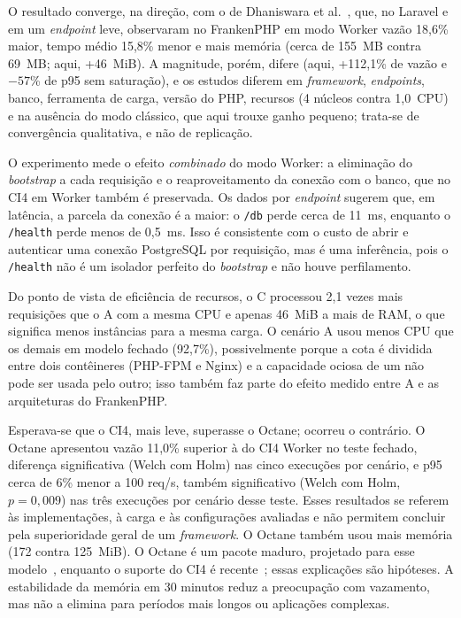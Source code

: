 O resultado converge, na direção, com o de Dhaniswara et al.~\cite{dhaniswara2025}, que, no Laravel e em um \textit{endpoint} leve, observaram no FrankenPHP em modo Worker vazão 18,6\% maior, tempo médio 15,8\% menor e mais memória (cerca de 155~MB contra 69~MB; aqui, +46~MiB). A magnitude, porém, difere (aqui, +112,1\% de vazão e $-57$\% de p95 sem saturação), e os estudos diferem em \textit{framework}, \textit{endpoints}, banco, ferramenta de carga, versão do PHP, recursos (4 núcleos contra 1,0~CPU) e na ausência do modo clássico, que aqui trouxe ganho pequeno; trata-se de convergência qualitativa, e não de replicação.

O experimento mede o efeito \emph{combinado} do modo Worker: a eliminação do \textit{bootstrap} a cada requisição e o reaproveitamento da conexão com o banco, que no CI4 em Worker também é preservada. Os dados por \textit{endpoint} sugerem que, em latência, a parcela da conexão é a maior: o \texttt{/db} perde cerca de 11~ms, enquanto o \texttt{/health} perde menos de 0,5~ms. Isso é consistente com o custo de abrir e autenticar uma conexão PostgreSQL por requisição, mas é uma inferência, pois o \texttt{/health} não é um isolador perfeito do \textit{bootstrap} e não houve perfilamento.

Do ponto de vista de eficiência de recursos, o C processou 2,1 vezes mais requisições que o A com a mesma CPU e apenas 46~MiB a mais de RAM, o que significa menos instâncias para a mesma carga. O cenário A usou menos CPU que os demais em modelo fechado (92,7\%), possivelmente porque a cota é dividida entre dois contêineres (PHP-FPM e Nginx) e a capacidade ociosa de um não pode ser usada pelo outro; isso também faz parte do efeito medido entre A e as arquiteturas do FrankenPHP.

Esperava-se que o CI4, mais leve, superasse o Octane; ocorreu o contrário. O Octane apresentou vazão 11,0\% superior à do CI4 Worker no teste fechado, diferença significativa (Welch com Holm) nas cinco execuções por cenário, e p95 cerca de 6\% menor a 100 req/s, também significativo (Welch com Holm, $p=0{,}009$) nas três execuções por cenário desse teste. Esses resultados se referem às implementações, à carga e às configurações avaliadas e não permitem concluir pela superioridade geral de um \textit{framework}. O Octane também usou mais memória (172 contra 125~MiB). O Octane é um pacote maduro, projetado para esse modelo~\cite{otwell2024}, enquanto o suporte do CI4 é recente~\cite{codeigniter2024}; essas explicações são hipóteses. A estabilidade da memória em 30 minutos reduz a preocupação com vazamento, mas não a elimina para períodos mais longos ou aplicações complexas.

